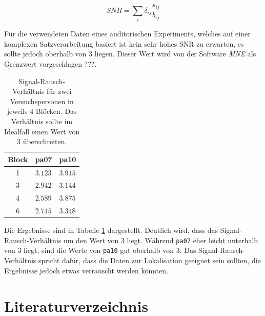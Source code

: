 \documentclass[doc,a4paper,12pt]{apa6}
\begin{document}
\begin{equation}
SNR = \sum_i \delta_{ij} \frac{s_{ij}}{b_{ij}}
\end{equation}

Für die verwendeten Daten eines auditorischen Experiments, welches auf einer komplexen Satzverarbeitung basiert ist kein sehr hohes SNR zu erwarten, es sollte jedoch oberhalb von $3$ liegen. Dieser Wert wird von der Software \emph{MNE} als Grenzwert vorgeschlagen ???.

\begin{table}[t]
\caption{}
\label{tab:snr}
\vspace*{3mm}
\begin{tabularx}{\textwidth}{cll}
Block & pa07 & pa10 \\
\hline
1 & $3.123$ & $3.915$\\
3 & $2.942$ & $3.144$\\
4 & $2.589$ & $3.875$\\
6 & $2.715$ & $3.348$\\
\hline
\end{tabularx}
\vspace*{3mm}
\caption*{Signal-Rausch-Verhältnis für zwei Versuchspersonen in jeweils 4 Blöcken. Das Verhältnis sollte im Idealfall einen Wert von $3$ überschreiten.}
\end{table}

Die Ergebnisse sind in Tabelle \ref{tab:snr} dargestellt. Deutlich wird, dass das Signal-Rausch-Verhältnis um den Wert von $3$ liegt. Während \texttt{pa07} eher leicht unterhalb von $3$ liegt, sind die Werte von \texttt{pa10} gut oberhalb von $3$. Das Signal-Rausch-Verhältnis spricht dafür, dass die Daten zur Lokalisation geeignet sein sollten, die Ergebnisse jedoch etwas verrauscht werden könnten.

\newpage
\section{Literaturverzeichnis}

\printbibliography[heading=none]

%
\end{document}

